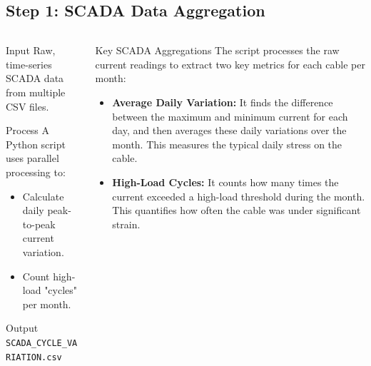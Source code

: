 \documentclass[a4paper,11pt]{article}
\begin{document}
\subsection{Step 1: SCADA Data Aggregation}
\begin{columns}[T]
    \begin{column}{0.5\textwidth}
        \begin{block}{Input}
            Raw, time-series SCADA data from multiple CSV files.
        \end{block}
        \begin{block}{Process}
            A Python script uses parallel processing to:
            \begin{itemize}
                \item Calculate daily peak-to-peak current variation.
                \item Count high-load "cycles" per month.
            \end{itemize}
        \end{block}
        \begin{block}{Output}
            \texttt{SCADA\_CYCLE\_VARIATION.csv}
        \end{block}
    \end{column}
    \begin{column}{0.5\textwidth}
        \begin{block}{Key SCADA Aggregations}
            The script processes the raw current readings to extract two key metrics for each cable per month:
            \begin{itemize}
                \item \textbf{Average Daily Variation:} It finds the difference between the maximum and minimum current for each day, and then averages these daily variations over the month. This measures the typical daily stress on the cable.
                \item \textbf{High-Load Cycles:} It counts how many times the current exceeded a high-load threshold during the month. This quantifies how often the cable was under significant strain.
            \end{itemize}
        \end{block}
    \end{column}
\end{columns}
\end{document}
